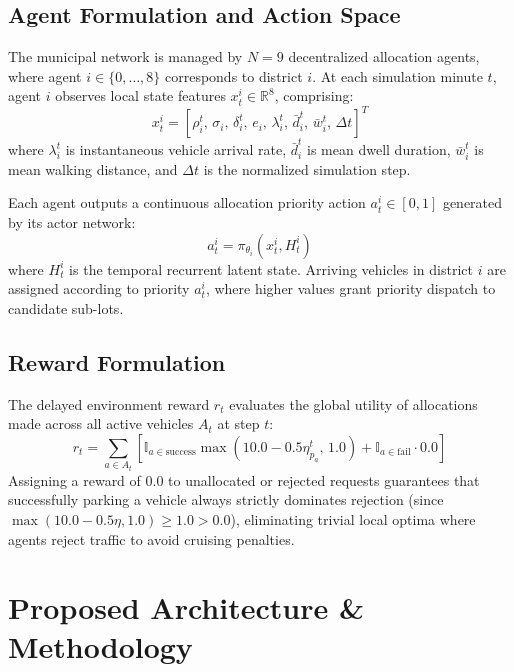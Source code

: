 \documentclass[journal]{IEEEtran}
\begin{document}
\subsection{Agent Formulation and Action Space}
The municipal network is managed by $N=9$ decentralized allocation agents, where agent $i \in \{0, \dots, 8\}$ corresponds to district $i$. At each simulation minute $t$, agent $i$ observes local state features $x_t^i \in \mathbb{R}^8$, comprising:
\begin{equation}
x_t^i = \left[ \rho_i^t, \, \sigma_i, \, \delta_i^t, \, e_i, \, \lambda_i^t, \, \bar{d}_i^t, \, \bar{w}_i^t, \, \Delta t \right]^T
\end{equation}
where $\lambda_i^t$ is instantaneous vehicle arrival rate, $\bar{d}_i^t$ is mean dwell duration, $\bar{w}_i^t$ is mean walking distance, and $\Delta t$ is the normalized simulation step.

Each agent outputs a continuous allocation priority action $a_t^i \in [0, 1]$ generated by its actor network:
\begin{equation}
a_t^i = \pi_{\theta_i}(x_t^i, H_t^i)
\end{equation}
where $H_t^i$ is the temporal recurrent latent state. Arriving vehicles in district $i$ are assigned according to priority $a_t^i$, where higher values grant priority dispatch to candidate sub-lots.

\subsection{Reward Formulation}
The delayed environment reward $r_t$ evaluates the global utility of allocations made across all active vehicles $A_t$ at step $t$:
\begin{equation}
r_t = \sum_{a \in A_t} \left[ \mathbb{I}_{a \in \text{success}} \max(10.0 - 0.5 \eta_{p_a}^t, \, 1.0) + \mathbb{I}_{a \in \text{fail}} \cdot 0.0 \right]
\label{eq:reward}
\end{equation}
Assigning a reward of $0.0$ to unallocated or rejected requests guarantees that successfully parking a vehicle always strictly dominates rejection (since $\max(10.0 - 0.5 \eta, 1.0) \ge 1.0 > 0.0$), eliminating trivial local optima where agents reject traffic to avoid cruising penalties.

\section{Proposed Architecture \& Methodology}
\label{sec:methodology}
\end{document}
